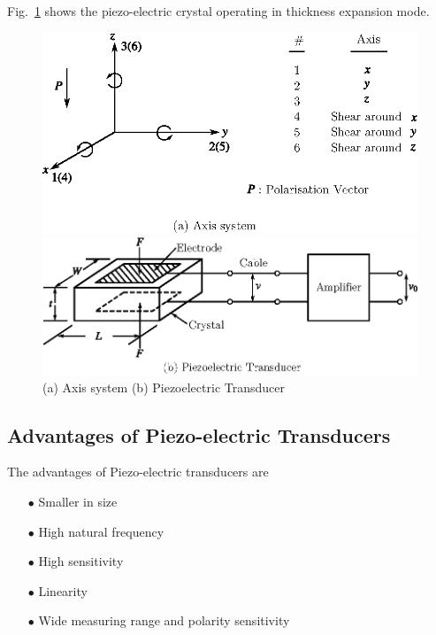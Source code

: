 \smallskip
Fig.~\ref{fig8.23} shows the piezo-electric crystal operating in thickness expansion mode.
\begin{figure}[H]
\centering
\includegraphics{chap8/fig8.23a.eps}

\bigskip
\bigskip
\includegraphics{chap8/fig8.23b.eps}

\caption{(a) Axis system (b) Piezoelectric Transducer}\label{fig8.23}
\end{figure}


\subsection{Advantages of Piezo-electric Transducers}\label{sec8.14.1}

The advantages of Piezo-electric transducers are
\begin{itemize}
\item[$\bullet$] Smaller in size

\item[$\bullet$] High natural frequency

\item[$\bullet$] High sensitivity

\item[$\bullet$] Linearity

\item[$\bullet$] Wide measuring range and polarity sensitivity
\end{itemize}


